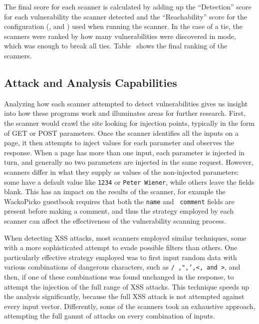 

The final score for each scanner is calculated by adding up the ``Detection''
score for each vulnerability the scanner detected and the ``Reachability'' score
for the configuration (\initial{}, \config{} and \manual{}) used when
running the scanner. In the case of a tie, the scanners were ranked
by how many vulnerabilities were discovered in \initial{} mode, which
was enough to break all ties. Table~ shows the
final ranking of the scanners.


\subsection{Attack and Analysis Capabilities}
Analyzing how each scanner attempted to detect vulnerabilities gives
us insight into how these programs work and  illuminates areas for
further research. First, the scanner would crawl the site
looking for injection points, typically in the form of GET or POST parameters.
Once the scanner identifies all the inputs on a page, it then attempts to inject
values for each parameter and observes the response. When a page
has more than one input, each parameter is injected in turn, and generally no
two parameters are injected in the same request. However, scanners differ in
what they supply as values of the non-injected parameters: some have a
default value like {\tt 1234} or {\tt Peter Wiener}, while others leave the
fields blank. This has an impact on the results of the scanner, for
example the WackoPicko guestbook requires that both the {\tt name} and {\tt
  comment} fields are present before making a comment, and thus the strategy
employed by each scanner can affect the effectiveness of the
vulnerability scanning process.

When detecting XSS attacks, most scanners employed similar techniques, some with
a more sophisticated attempt to evade possible filters than others. One particularly
effective strategy employed was to first input random data with various
combinations of dangerous characters, such as {\tt /\ ,",',<, and >}, and then, if
one of these combinations was found unchanged in the response, to attempt the
injection of the full range
of XSS attacks. This
technique speeds up the analysis 
significantly, because the full XSS attack is not attempted
against every input vector. Differently, some of the scanners took an
exhaustive 
approach, attempting the full gamut of attacks on every combination of inputs.


